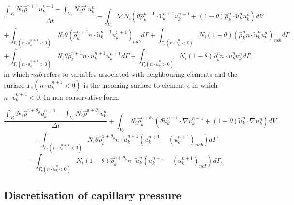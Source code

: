 \begin{equation}
\frac{
\int_{V_e} N_i \hat\rho^{n+1} u^{n+1}_k -
\int_{V_e} N_i \hat\rho^{n} u^{n}_k }
{\Delta t}
-
\int_{V_e} \nabla N_i
(\theta \hat\rho_k^{n+1} \cdot \tilde u_k^{n+1} u_k^{n+1} +
(1-\theta) \hat\rho_k^{n} \cdot \tilde u_k^{n} u_k^{n} ) dV
\label{inertia-disc-cons-1}
\end{equation}
\begin{equation}
+
\int_{\Gamma_e (n\cdot \tilde u_k^{n+1}<0)}
 N_i \theta ( \hat\rho_k^{n+1} n\cdot \tilde u_k^{n+1}
u_k^{n+1})_{nab}  d\Gamma
+
\int_{\Gamma_e (n\cdot \tilde u_k^{n}<0)}
 N_i(1-\theta) (\hat\rho_k^{n} n\cdot \tilde u_k^{n}
u_k^{n})_{nab}  d\Gamma
\label{inertia-disc-cons-2}
\end{equation}
\begin{equation}
+
\int_{\Gamma_e (n\cdot \tilde u_k^{n+1}>0)} N_i
\theta  \hat\rho_k^{n+1}
n\cdot \tilde u_k^{n+1}    u_k^{n+1}  d\Gamma
+
\int_{\Gamma_e (n\cdot \tilde u_k^{n}>0)} N_i
 (1-\theta) \hat\rho_k^{n} n\cdot \tilde u_k^{n}  u_k^{n} d\Gamma ,
\label{inertia-disc-cons-3}
\end{equation}
in which $nab$ refers to variables associated
with neighbouring elements and the surface
$\Gamma_e (n\cdot \tilde u_k^{n+1}<0)$ is
the incoming surface to
element $e$ in which
$n\cdot \tilde u_k^{n+1}<0$.
In non-conservative form:


\begin{equation}
\frac{
\int_{V_e} N_i \hat\rho^{n+\theta_\rho} u^{n+1}_k -
\int_{V_e} N_i \hat\rho^{n+\theta_\rho} u^{n}_k }
{\Delta t}
+
\int_{V_e} N_i \hat\rho_k^{n+\theta_\rho}
(\theta  \tilde u_k^{n+1} \cdot\nabla u_k^{n+1} +
(1-\theta)  \tilde u_k^{n} \cdot\nabla u_k^{n} ) dV
\label{inertia-disc-non-cons-1}
\end{equation}
\begin{equation}
-
\int_{\Gamma_e (n\cdot \tilde u_k^{n+1}<0)}
N_i \theta \hat\rho_k^{n+\theta_\rho} n\cdot \tilde u_k^{n+1} (u_k^{n+1} - (u_k^{n+1})_{nab} ) d\Gamma
\label{inertia-disc-non-cons-2}
\end{equation}
\begin{equation}
-
\int_{\Gamma_e (n\cdot \tilde u_k^{n}<0)} N_i (1-\theta)\hat\rho_k^{n+\theta_\rho} n\cdot \tilde u_k^{n}  (u_k^{n+1} - (u_k^{n+1})_{nab} ) d\Gamma .
\label{inertia-disc-non-cons-3}
\end{equation}


\subsection{Discretisation of capillary pressure}

